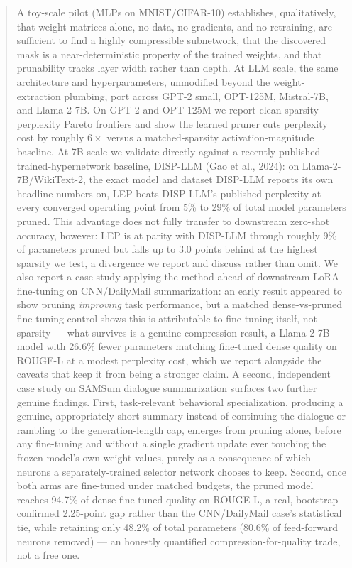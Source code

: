 \documentclass[11pt]{article}
\begin{document}
\begin{abstract}
A toy-scale pilot (MLPs on MNIST/CIFAR-10) establishes, qualitatively, that
weight matrices alone, no data, no gradients, and no retraining, are sufficient
to find a highly compressible subnetwork, that the discovered mask is a
near-deterministic property of the trained weights, and that prunability
tracks layer width rather than depth. At LLM scale, the same architecture and
hyperparameters, unmodified beyond the weight-extraction plumbing, port across
GPT-2 small, OPT-125M, Mistral-7B, and Llama-2-7B. On GPT-2 and OPT-125M we
report clean sparsity-perplexity Pareto frontiers and show the learned pruner
cuts perplexity cost by roughly $6\times$ versus a matched-sparsity
activation-magnitude baseline. At 7B scale we validate directly against a
recently published trained-hypernetwork baseline, DISP-LLM (Gao et al.,
2024): on Llama-2-7B/WikiText-2, the exact model and dataset DISP-LLM reports
its own headline numbers on, LEP beats DISP-LLM's published perplexity at
every converged operating point from 5\% to 29\% of total model parameters
pruned. This advantage does not fully transfer to downstream zero-shot
accuracy, however: LEP is at parity with DISP-LLM through roughly 9\% of
parameters pruned but falls up to 3.0 points behind at the highest sparsity
we test, a divergence we report and discuss rather than omit. We also report a
case study applying the method ahead of downstream LoRA fine-tuning on
CNN/DailyMail summarization: an early result appeared to show pruning
\emph{improving} task performance, but a matched dense-vs-pruned fine-tuning
control shows this is attributable to fine-tuning itself, not sparsity ---
what survives is a genuine compression result, a Llama-2-7B model with
26.6\% fewer parameters matching fine-tuned dense quality on ROUGE-L at a
modest perplexity cost, which we report alongside the caveats that keep it
from being a stronger claim. A second, independent case study on SAMSum
dialogue summarization surfaces two further genuine findings. First,
task-relevant behavioral specialization, producing a genuine, appropriately
short summary instead of continuing the dialogue or rambling to the
generation-length cap, emerges from pruning alone, before any fine-tuning
and without a single gradient update ever touching the frozen model's own
weight values, purely as a consequence of which neurons a separately-trained
selector network chooses to keep. Second, once both arms are fine-tuned
under matched budgets, the pruned model reaches 94.7\% of dense fine-tuned
quality on ROUGE-L, a real, bootstrap-confirmed 2.25-point gap rather than
the CNN/DailyMail case's statistical tie, while retaining only 48.2\% of
total parameters (80.6\% of feed-forward neurons removed) --- an honestly
quantified compression-for-quality trade, not a free one.
\end{abstract}
\end{document}

